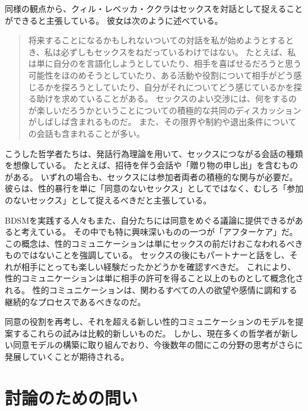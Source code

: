 \documentclass[paper=a4,book,openany]{jlreq} \usepackage{mystyle}
\begin{document}
同様の観点から、クィル・レベッカ・ククラはセックスを対話として捉えることができると主張している。
彼女は次のように述べている。

\begin{quote}
将来することになるかもしれないついての対話を私が始めようとするとき、私は必ずしもセックスをねだっているわけではない。
たとえば、私は単に自分のを言語化しようとしていたり、相手を喜ばせるだろうと思う可能性をほのめそうとしていたり、ある活動や役割について相手がどう感じるかを探ろうとしていたり、自分がそれについてどう感じているかを探る助けを求めていることがある。
セックスのよい交渉には、何をするのが楽しいだろうかということについての積極的な共同のディスカッションがしばしば含まれるものだ。
また、その限界や制約や退出条件についての会話も含まれることが多い。
\citep[p.76]{kukla18:_thats_what_she_said}
\end{quote}

こうした哲学者たちは、発話行為理論を用いて、セックスにつながる会話の種類を想像している。
たとえば、招待を伴う会話や「贈り物の申し出」を含むものがある\citep[p.74]{kukla18:_thats_what_she_said}。
いずれの場合も、セックスには参加者両者の積極的な関与が必要だ。
彼らは、性的暴行を単に「同意のないセックス」としてではなく、むしろ「参加のないセックス」として捉えるべきだと主張している。

BDSMを実践する人々もまた、自分たちには同意をめぐる議論に提供できるがあると考えている。
その中でも特に興味深いものの一つが「アフターケア」だ。
この概念は、性的コミュニケーションは単にセックスの前だけおこなわれるべきものではないことを強調している。
セックスの後にもパートナーと話をし、それが相手にとっても楽しい経験だったかどうかを確認すべきだ。
これにより、性的コミュニケーションは単に相手の許可を得ること以上のものとして概念化される。
性的コミュニケーションは、関わるすべての人の欲望や感情に調和する継続的なプロセスであるべきなのだ。

同意の役割を再考し、それを超える新しい性的コミュニケーションのモデルを提案するこれらの試みは比較的新しいものだ。
しかし、現在多くの哲学者が新しい同意モデルの構築に取り組んでおり、今後数年の間にこの分野の思考がさらに発展していくことが期待される。

\section{討論のための問い}
\end{document}
